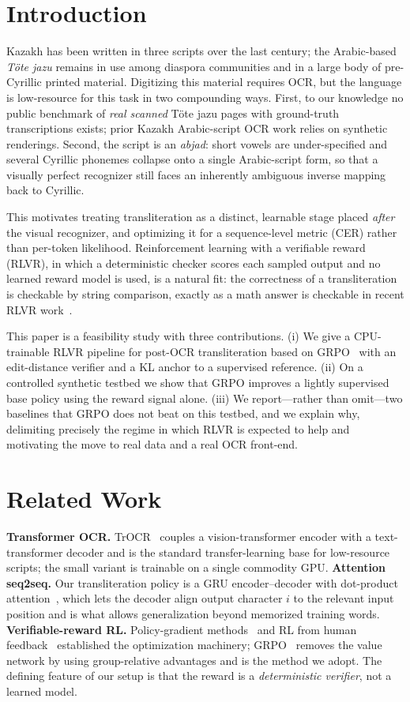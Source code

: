 \documentclass[conference]{IEEEtran}
\begin{document}
\section{Introduction}
Kazakh has been written in three scripts over the last century; the Arabic-based
\emph{T\"ote jazu} remains in use among diaspora communities and in a large body
of pre-Cyrillic printed material. Digitizing this material requires OCR, but the
language is low-resource for this task in two compounding ways. First, to our
knowledge no public benchmark of \emph{real scanned} T\"ote jazu pages with
ground-truth transcriptions exists; prior Kazakh Arabic-script OCR work relies on
synthetic renderings. Second, the script is an \emph{abjad}: short vowels are
under-specified and several Cyrillic phonemes collapse onto a single Arabic-script
form, so that a visually perfect recognizer still faces an inherently ambiguous
inverse mapping back to Cyrillic.

This motivates treating transliteration as a distinct, learnable stage placed
\emph{after} the visual recognizer, and optimizing it for a sequence-level metric
(CER) rather than per-token likelihood. Reinforcement learning with a
verifiable reward (RLVR), in which a deterministic checker scores each sampled
output and no learned reward model is used, is a natural fit: the correctness of a
transliteration is checkable by string comparison, exactly as a math answer is
checkable in recent RLVR work~\cite{deepseekmath}.

This paper is a feasibility study with three contributions. (i) We give a
CPU-trainable RLVR pipeline for post-OCR transliteration based on
GRPO~\cite{deepseekmath} with an edit-distance verifier and a KL anchor to a
supervised reference. (ii) On a controlled synthetic testbed we show that GRPO
improves a lightly supervised base policy using the reward signal alone. (iii) We
report---rather than omit---two baselines that GRPO does not beat on this
testbed, and we explain why, delimiting precisely the regime in which RLVR is
expected to help and motivating the move to real data and a real OCR front-end.

\section{Related Work}
\textbf{Transformer OCR.} TrOCR~\cite{trocr} couples a vision-transformer encoder
with a text-transformer decoder and is the standard transfer-learning base for
low-resource scripts; the small variant is trainable on a single commodity GPU.
\textbf{Attention seq2seq.} Our transliteration policy is a GRU encoder--decoder
with dot-product attention~\cite{bahdanau}, which lets the decoder align output
character $i$ to the relevant input position and is what allows generalization
beyond memorized training words.
\textbf{Verifiable-reward RL.} Policy-gradient methods~\cite{reinforce,ppo} and
RL from human feedback~\cite{instructgpt} established the optimization machinery;
GRPO~\cite{deepseekmath} removes the value network by using group-relative
advantages and is the method we adopt. The defining feature of our setup is that
the reward is a \emph{deterministic verifier}, not a learned model.
\end{document}
